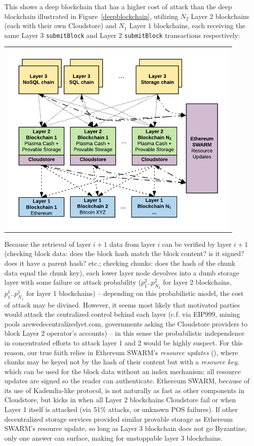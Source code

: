 \documentclass{article}
\begin{document}
This shows a deep blockchain that has a higher cost of attack than the deep blockchain illustrated in Figure~\ref{deepblockchain}, utilizing $N_2$ Layer 2 blockchains (each with their own Cloudstore) and $N_1$ Layer 1 blockchains, each receiving the same Layer 3 \texttt{submitBlock} and Layer 2 \texttt{submitBlock} transactions respectively:

\begin{tabular}{c}
\centerline{\includegraphics[width=12cm]{DeepBlockchain2.png}} \\
\end{tabular}

\noindent Because the retrieval of layer $i+1$ data from layer $i$ can be verified by layer $i+1$ (checking block data: does the block hash match the block content?  is it signed?  does it have a parent hash? etc.; checking chunks: does the hash of the chunk data equal the chunk key), each lower layer node devolves into a dumb storage layer with some failure or attack probability ($p^2_{1}..p^2_{N_2}$ for layer 2 blockchains, $p_1^{1}..p^1_{N_1}$ for layer 1 blockchains) -- depending on this probabilistic model, the cost of attack may be divined.   However, it seems most likely that motivated parties would attack the centralized control behind each layer (c.f. via EIP999, mining pools arewedecentralizedyet.com, governments asking the Cloudstore providers to block Layer 2 operator's accounts) -- in this sense the probabilistic independence in concentrated efforts to attack layer 1 and 2 would be highly suspect.   For this reason, our true faith relies in Ethereum SWARM's {\em resource updates} (\cite{swarm}), where chunks may be keyed not by the hash of their content but with a {\em resource key}, which can be used for the block data without an index mechanism; all resource updates are signed so the reader can authenticate.  Ethereum SWARM, because of its use of Kademlia-like protocol, is not naturally as fast as other components in Cloudstore, but kicks in when all Layer 2 blockchains Cloudstore fail or when Layer 1 itself is attacked (via 51\% attacks, or unknown POS failures).   If other decentralized storage services provided similar provable storage as Ethereum SWARM's resource update, so long as Layer 3 blockchain does not go Byzantine, only one answer can surface, making for unstoppable layer 3 blockchains.
\end{document}
